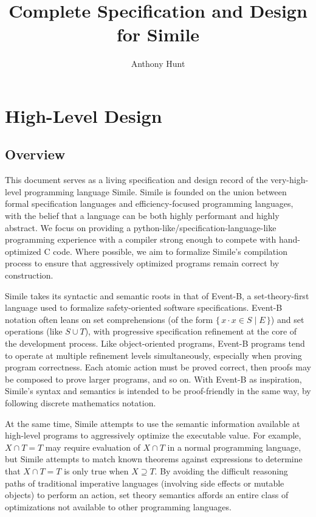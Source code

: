 \documentclass{article}
\title{Complete Specification and Design for Simile}
\author{Anthony Hunt}
\newcommand{\bSet}[3]{%
  \{\, #1 \cdot #2 \mid #3 \, \}%
}
\begin{document}
\maketitle
\tableofcontents
\newpage

\section{High-Level Design}
\subsection{Overview}
This document serves as a living specification and design record of the very-high-level programming language Simile. Simile is founded on the union between formal specification languages and efficiency-focused programming languages, with the belief that a language can be both highly performant and highly abstract. We focus on providing a python-like/specification-language-like programming experience with a compiler strong enough to compete with hand-optimized C code. Where possible, we aim to formalize Simile's compilation process to ensure that aggressively optimized programs remain correct by construction.

Simile takes its syntactic and semantic roots in that of Event-B, a set-theory-first language used to formalize safety-oriented software specifications. Event-B notation often leans on set comprehensions (of the form $\bSet{x}{x \in S}{E}$) and set operations (like $S \cup T$), with progressive specification refinement at the core of the development process. Like object-oriented programs, Event-B programs tend to operate at multiple refinement levels simultaneously, especially when proving program correctness. Each atomic action must be proved correct, then proofs may be composed to prove larger programs, and so on. With Event-B as inspiration, Simile's syntax and semantics is intended to be proof-friendly in the same way, by following discrete mathematics notation.

At the same time, Simile attempts to use the semantic information available at high-level programs to aggressively optimize the executable value. For example, $X \cap T = T$ may require evaluation of $X \cap T$ in a normal programming language, but Simile attempts to match known theorems against expressions to determine that $X \cap T = T$ is only true when $X \supseteq T$. By avoiding the difficult reasoning paths of traditional imperative languages (involving side effects or mutable objects) to perform an action, set theory semantics affords an entire class of optimizations not available to other programming languages.
\end{document}
